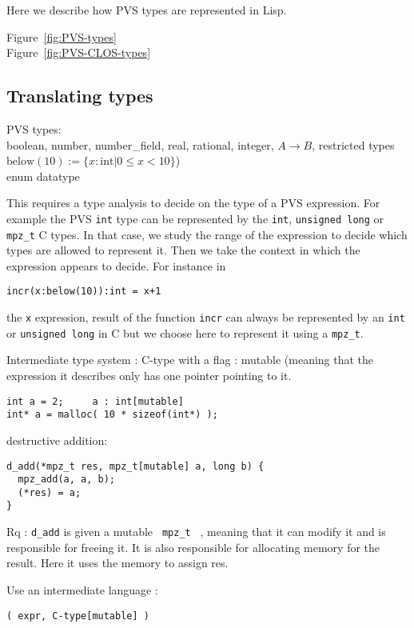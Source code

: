 \documentclass[12pt,a4paper]{article}
\newcommand{\cl}[1]{\texttt{#1}}
\newcommand{\mpzt}{ \texttt{ mpz\_t } }
\begin{document}
Here we describe how PVS types are represented in 
Lisp.

Figure~\ref{fig:PVS-types} \\
Figure~\ref{fig:PVS-CLOS-types}


\subsection{Translating types}
PVS types:\\
boolean, number, number\_field, real, 
rational, integer, $A \rightarrow B$, restricted types
$\text{below}(10) := \{ x:\text{int} | 0 \leq x < 10 \} $)  \\
enum
datatype


This requires a type analysis to decide on the type of a PVS expression. For example the PVS \cl{int} type can be represented by the \cl{int}, \cl{unsigned long} or \cl{mpz\_t} C types. In that case, we study the range of the expression to decide which types are allowed to represent it. Then we take the context in which the expression appears to decide. For instance in
\begin{lstlisting}
incr(x:below(10)):int = x+1
\end{lstlisting}
the \cl{x} expression, result of the function \cl{incr} can always be represented by an \cl{int} or \cl{unsigned long} in C but we choose here to represent it using a \cl{mpz\_t}.

Intermediate type system :
C-type with a flag : mutable (meaning that the expression it describes only has one pointer pointing to it.

\begin{lstlisting}
int a = 2;     a : int[mutable]
int* a = malloc( 10 * sizeof(int*) );  
\end{lstlisting}

destructive addition:

\begin{lstlisting}
d_add(*mpz_t res, mpz_t[mutable] a, long b) {
  mpz_add(a, a, b);
  (*res) = a;
}
\end{lstlisting}

Rq : \cl{d\_add} is given a mutable \mpzt, meaning that it can modify it and is responsible for freeing it.
It is also responsible for allocating memory for the result.
Here it uses the memory to assign res.



Use an intermediate language :

\begin{lstlisting}
( expr, C-type[mutable] )
\end{lstlisting}
\end{document}
